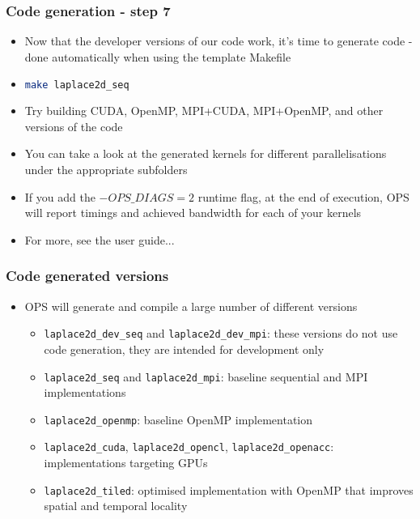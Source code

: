 \documentclass{beamer}
\begin{document}
\begin{frame}[fragile]
\frametitle{Code generation - step 7}
\begin{itemize}
\item Now that the developer versions of our code work, it's time to generate code - done automatically when using the template Makefile
\item \begin{lstlisting}[language=bash,basicstyle=\tiny]
make laplace2d_seq
\end{lstlisting}
\item Try building CUDA, OpenMP, MPI+CUDA, MPI+OpenMP, and other versions of the code
\item You can take a look at the generated kernels for different parallelisations under the appropriate subfolders
\item If you add the $-OPS\_DIAGS=2$ runtime flag, at the end of execution, OPS will report timings and achieved bandwidth for each of your kernels
\item For more, see the user guide...
\end{itemize}
\end{frame}

\begin{frame}[fragile]
\frametitle{Code generated versions}
\begin{itemize}
\item OPS will generate and compile a large number of different versions
\begin{itemize}
  \item \texttt{laplace2d\_dev\_seq} and \texttt{laplace2d\_dev\_mpi}: these versions do not use code generation, they are intended for development only
  \item \texttt{laplace2d\_seq} and \texttt{laplace2d\_mpi}: baseline sequential and MPI implementations
  \item \texttt{laplace2d\_openmp}: baseline OpenMP implementation
  \item \texttt{laplace2d\_cuda}, \texttt{laplace2d\_opencl}, \texttt{laplace2d\_openacc}: implementations targeting GPUs
  \item \texttt{laplace2d\_tiled}: optimised implementation with OpenMP that improves spatial and temporal locality
\end{itemize}
\end{itemize}
\end{frame}
\end{document}
